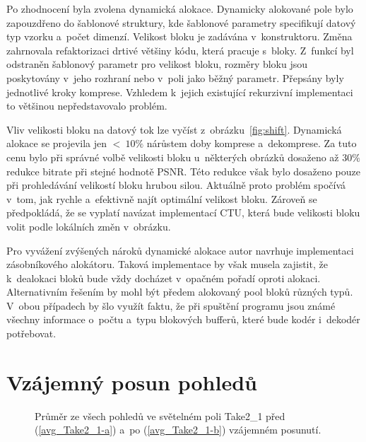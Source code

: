 Po zhodnocení byla zvolena dynamická alokace.
Dynamicky alokované pole bylo zapouzdřeno do šab\-lonové struktury, kde šab\-lonové pa\-ra\-me\-try specifikují datový typ vzorku a~počet dimenzí.
Velikost bloku je zadávána v~konstruktoru.
Změna zahrnovala refaktorizaci drtivé většiny kódu, která pracuje s~bloky.
Z~funkcí byl odstraněn šab\-lonový pa\-ra\-me\-tr pro velikost bloku, roz\-měry bloku jsou poskytovány v~jeho rozhraní nebo v~poli jako běžný pa\-ra\-me\-tr.
Přepsány byly jednotlivé kroky kom\-pre\-se.
Vzhledem k~jejich existující rekurzivní implementaci to většinou nepředstavovalo problém.

Vliv velikosti bloku na datový tok lze vyčíst z~ob\-ráz\-ku~\ref{fig:shift}.
Dynamická alokace se projevila jen $<~10\%$ ná\-růstem doby kom\-pre\-se a~dekom\-pre\-se.
Za tuto cenu bylo při správné volbě velikosti bloku u~některých obrázků dosaženo až $30\%$ redukce bitrate při stejné hodnotě PSNR.
Této redukce však bylo dosaženo pouze při prohledávání velikostí bloku hrubou silou.
Aktuálně proto problém spočívá v~tom, jak rychle a~efektivně najít optimální velikost bloku.
Zároveň se předpokládá, že se vyplatí navázat implementací CTU, která bude velikosti bloku volit podle lokálních změn v~obrázku.

Pro vyvážení zvýšených nároků dynamické alokace autor navrhuje implementaci zásobníkového alokátoru.
Taková implementace by však musela zajistit, že k~dealokaci bloků bude vždy docházet v~opačném pořadí oproti alokaci.
Alternativním řešením by mohl být předem alokovaný pool bloků různých typů.
V~obou případech by šlo využít faktu, že při spuštění programu jsou známé všechny informace o~počtu a~typu blokových bufferů, které bude kodér i~dekodér potřebovat.

\section{Vzájemný posun po\-hledů}\label{disp}

\begin{figure}[htbp]\centering
  \centering
  \vspace*{1em}
  \caption{Průměr ze všech po\-hledů ve světelném poli Take2\_1 před (\ref{avg_Take2_1-a}) a~po (\ref{avg_Take2_1-b}) vzájemném posunutí.}
  \label{fig:avg_Take2_1}
\end{figure}


